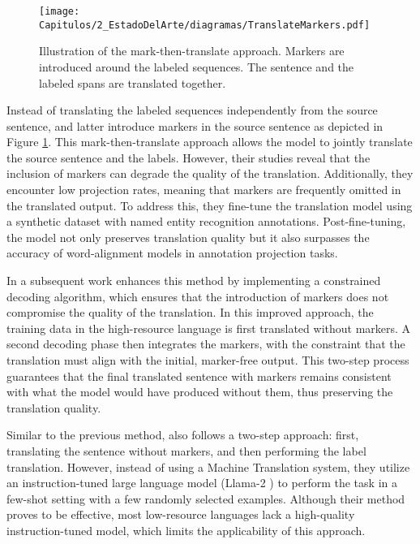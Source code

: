 \begin{figure}[ht]
    \centering
    \texttt{[image: Capitulos/2\_EstadoDelArte/diagramas/TranslateMarkers.pdf]}
    \caption{Illustration of the mark-then-translate approach. Markers are introduced around the labeled sequences. The sentence and the labeled spans are translated together.}
    \label{fig:chap3_translate_markers}
\end{figure}

Instead of translating the labeled sequences independently from the source sentence, \cite{daza-frank-2019-translate} and latter \cite{chen-etal-2023-frustratingly} introduce markers in the source sentence as depicted in Figure \ref{fig:chap3_translate_markers}. This mark-then-translate approach allows the model to jointly translate the source sentence and the labels. However, their studies reveal that the inclusion of markers can degrade the quality of the translation. Additionally, they encounter low projection rates, meaning that markers are frequently omitted in the translated output. To address this, they fine-tune the translation model using a synthetic dataset with named entity recognition annotations. Post-fine-tuning, the model not only preserves translation quality but it also surpasses the accuracy of word-alignment models in annotation projection tasks.



In a subsequent work \cite{DBLP:journals/corr/abs-2402-03131} enhances this method by implementing a constrained decoding algorithm, which ensures that the introduction of markers does not compromise the quality of the translation. In this improved approach, the training data in the high-resource language is first translated without markers. A second decoding phase then integrates the markers, with the constraint that the translation must align with the initial, marker-free output. This two-step process guarantees that the final translated sentence with markers remains consistent with what the model would have produced without them, thus preserving the translation quality.



Similar to the previous method, \cite{parekh2024contextual} also follows a two-step approach: first, translating the sentence without markers, and then performing the label translation. However, instead of using a Machine Translation system, they utilize an instruction-tuned large language model (Llama-2 \cite{DBLP:journals/corr/abs-2307-09288}) to perform the task in a few-shot setting with a few randomly selected examples. Although their method proves to be effective, most low-resource languages lack a high-quality instruction-tuned model, which limits the applicability of this approach.


